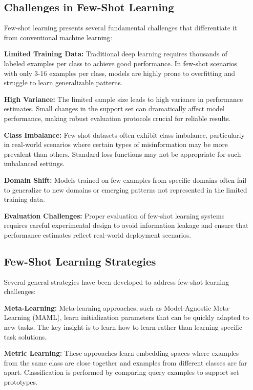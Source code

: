 \subsection{Challenges in Few-Shot Learning}

Few-shot learning presents several fundamental challenges that differentiate it from conventional machine learning:

\textbf{Limited Training Data:} Traditional deep learning requires thousands of labeled examples per class to achieve good performance. In few-shot scenarios with only 3-16 examples per class, models are highly prone to overfitting and struggle to learn generalizable patterns.

\textbf{High Variance:} The limited sample size leads to high variance in performance estimates. Small changes in the support set can dramatically affect model performance, making robust evaluation protocols crucial for reliable results.

\textbf{Class Imbalance:} Few-shot datasets often exhibit class imbalance, particularly in real-world scenarios where certain types of misinformation may be more prevalent than others. Standard loss functions may not be appropriate for such imbalanced settings.

\textbf{Domain Shift:} Models trained on few examples from specific domains often fail to generalize to new domains or emerging patterns not represented in the limited training data.

\textbf{Evaluation Challenges:} Proper evaluation of few-shot learning systems requires careful experimental design to avoid information leakage and ensure that performance estimates reflect real-world deployment scenarios.

\subsection{Few-Shot Learning Strategies}

Several general strategies have been developed to address few-shot learning challenges:

\textbf{Meta-Learning:} Meta-learning approaches, such as Model-Agnostic Meta-Learning (MAML), learn initialization parameters that can be quickly adapted to new tasks. The key insight is to learn how to learn rather than learning specific task solutions.

\textbf{Metric Learning:} These approaches learn embedding spaces where examples from the same class are close together and examples from different classes are far apart. Classification is performed by comparing query examples to support set prototypes.

